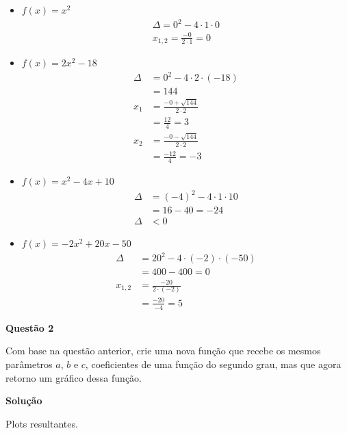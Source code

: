 \documentclass[12pt, a4paper]{article}
\begin{document}
\begin{itemize}
	\item $f(x) = x^2$
	\begin{align*}
		\Delta = 0^2 - 4\cdot 1\cdot 0 \\
		x_{1,2} = \frac{-0}{2\cdot1} = 0
	\end{align*}
	\item $f(x) = 2x^2 - 18$
	\begin{align*}
		\Delta &= 0^2 - 4\cdot 2\cdot (-18) \\
		&= 144\\
		x_1 &= \frac{-0 + \sqrt{144}}{2\cdot2}\\
		&= \frac{12}{4} = 3\\
		x_2 &= \frac{-0 - \sqrt{144}}{2\cdot2}\\
		&= \frac{-12}{4} = -3
	\end{align*}
	\item $f(x) = x^2 - 4x + 10$
	\begin{align*}
		\Delta &= (-4)^2 - 4\cdot 1\cdot 10 \\
		&= 16 - 40 = -24\\
		\Delta &< 0
	\end{align*}
	\item $f(x) = -2x^2 + 20x - 50$
	\begin{align*}
		\Delta &= 20^2 - 4\cdot (-2)\cdot (-50) \\
		&= 400 - 400 = 0\\
		x_{1,2} &= \frac{-20}{2\cdot(-2)}\\
		&= \frac{-20}{-4} = 5
	\end{align*}
\end{itemize}






\textbf{Questão 2}

Com base na questão anterior, crie uma nova função que recebe os mesmos parâmetros $a$, $b$ e $c$, coeficientes de uma função do segundo grau, mas que agora retorno um gráfico dessa função.



\textbf{Solução}




Plots resultantes.
\end{document}
